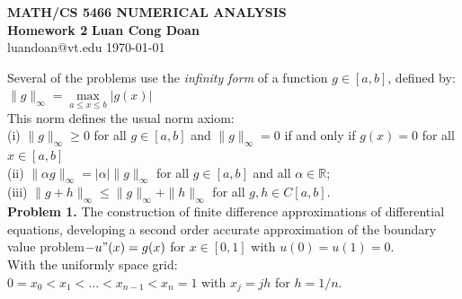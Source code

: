 \documentclass[14pt,a4paper]{article}
\begin{document}
\label{cover}
\begin{center}
	\vspace*{3cm}
	\large{\textbf{MATH/CS 5466 NUMERICAL ANALYSIS \\ Homework 2}}
	\vfill
	\textbf{Luan Cong Doan} \\ luandoan@vt.edu
	\vfill
	\today
\end{center}
\pagebreak

\label{Answer Sheet - Numerical Homework 2}
\doublespacing
Several of the problems use the \textit{infinity form} of a function $g \in [a,b]$, defined by:\\
\hspace*{5cm} $\|g\|_{\infty} = \max\limits_{a\leq x \leq b}|g(x)|$ \\
This norm defines the usual norm axiom:\\
(i) $\|g\|_{\infty} \geq 0$ for all $g \in [a,b]$ and $\|g\|_{\infty} = 0$ if and only if $g(x) = 0$ for all $x \in [a,b]$\\
(ii) $\|\alpha g\|_{\infty} = |\alpha|\|g\|_{\infty}$ for all $g \in [a,b]$ and all $\alpha \in \mathbb{R}$; \\
(iii) $\|g+h\|_{\infty} \leq \|g\|_{\infty} + \|h\|_{\infty}$ for all $g,h \in C[a,b]$.\\

\label{Problem 1}
\large\textbf{Problem 1.} The construction of finite difference approximations of differential equations, developing a second order accurate approximation of the boundary value problem$-u"(x) = g(x)$ for $x \in [0,1]$ with $u(0) = u(1) = 0$.\\
With the uniformly space grid:\\
\hspace*{3cm} $ 0 = x_0 < x_1 < ... < x_{n-1} < x_n = 1$ \hspace{0.5cm} 
with $x_j = jh$ for $h = 1/n$.
\end{document}
